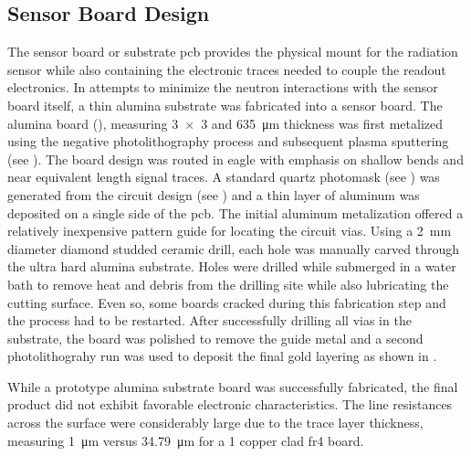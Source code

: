 \documentclass[../../../main.tex]{subfiles}%
\begin{document}
%
    \subsection{Sensor Board Design}%
    \label{sec:chapter-3:multi-channel-system:sensor-board-design}%
    The sensor board or substrate \gls{pcb} provides the physical mount for the radiation sensor while also containing the electronic traces needed to couple the readout electronics.
    In attempts to minimize the neutron interactions with the sensor board itself, a thin \gls{alumina} substrate was fabricated into a sensor board.
    The \gls{alumina} board (), measuring \SI{3 x 3}{\inch} and \SI{635}{\micro\meter} thickness was first metalized using the negative photolithography process and subsequent plasma sputtering (see ).
    The board design was routed in \gls{eagle} with emphasis on shallow bends and near equivalent length signal traces.
    A standard quartz photomask (see ) was generated from the circuit design (see ) and a thin layer of aluminum was deposited on a single side of the \gls{pcb}.
    The initial aluminum metalization offered a relatively inexpensive pattern guide for locating the circuit vias.
    Using a \SI{2}{\milli\meter} diameter diamond studded ceramic drill, each hole was manually carved through the ultra hard \gls{alumina} substrate.
    Holes were drilled while submerged in a water bath to remove heat and debris from the drilling site while also lubricating the cutting surface.
    Even so, some boards cracked during this fabrication step and the process had to be restarted.
    After successfully drilling all vias in the substrate, the board was polished to remove the guide metal and a second photolithograhy run was used to deposit the final gold layering as shown in .
    \par%
    While a prototype \gls{alumina} substrate board was successfully fabricated, the final product did not exhibit favorable electronic characteristics.
    The line resistances across the surface were considerably large due to the trace layer thickness, measuring \Xmath{<}\SI{1}{\micro\meter} versus \SI{34.79}{\micro\meter} for a \SI{1}{\ounce} copper clad \gls{fr4} board.
\end{document}
